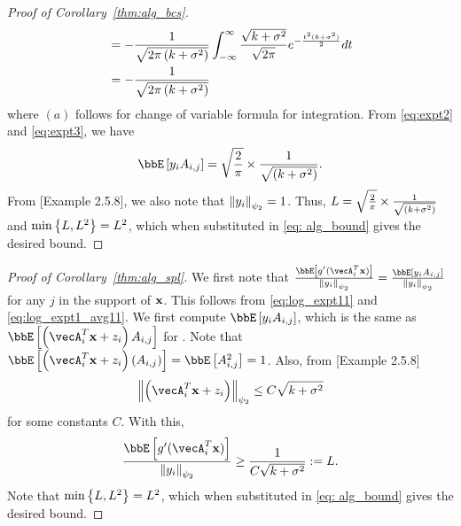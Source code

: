 \begin{proof}[Proof of Corollary~\ref{thm:alg_bcs}]
\begin{align}
& = -\frac{1}{\sqrt{2\pi\left(k+\sigma^2\right)}}\int_{-\infty}^{\infty}\frac{\sqrt{k+\sigma^2}}{\sqrt{2\pi}}e^{-\frac{t^2(k+\sigma^2)}{2}}dt\nonumber\\
& = -\frac{1}{\sqrt{2\pi\left(k+\sigma^2\right)}}\label{eq:expt3}
\end{align} where $(a)$ follows for change of variable formula for integration. From \eqref{eq:expt2} and \eqref{eq:expt3}, we have 
\begin{align}
\bbE\insq{y_i A_{i,j}} = \sqrt{\frac{2}{\pi}}\times\frac{1}{\sqrt{\inp{k+\sigma^2}}}.\label{eq:expt4}
\end{align} From [Example 2.5.8]\cite{vershynin}, we also note that $\left\lVert{y_i}\right\rVert_{\psi_2} = 1$. Thus, $L = \sqrt{\frac{2}{\pi}}\times\frac{1}{\sqrt{\left(k+\sigma^2\right)}}$ and $\min\left\{L, L^2\right\} = L^2$, which when substituted in \eqref{eq: alg_bound}  gives the desired bound.
\end{proof}

\begin{proof}[Proof of Corollary~\ref{thm:alg_spl}]
We first note that  $\frac{\bbE\insq{g'(\vecA_i^T\bx)}}{\normi{{y_i}}_{\psi_2}} = \frac{\bbE\insq{y_iA_{i,j}}}{\normi{{y_i}}_{\psi_2}}$ for  any $j$ in the support of $\mathbf{x}$. This follows from \eqref{eq:log_expt11} and \eqref{eq:log_expt1_avg11}. We first compute $\bbE\insq{y_iA_{i,j}}$, which is the same as $\bbE\insq{\inp{\vecA_i^T\bx+z_i}A_{i,j}}$ for \spl. 
Note that $\bbE\insq{\inp{\vecA_i^T\bx+z_i}\inp{A_{i, j}}} = \bbE\insq{A_{i, j}^2} = 1$.
Also, from [Example 2.5.8]\cite{vershynin} 
\begin{align*}
\normi{\inp{\vecA_i^T\bx+z_i}}_{\psi_2}\leq C\sqrt{k+\sigma^2}\\
\end{align*} for some constants $C$. With this,
\begin{align*}
\frac{\bbE\insq{g'(\vecA_i^T\bx)}}{\normi{{y_i}}_{\psi_2}}\geq \frac{1}{C\sqrt{k+\sigma^2}}: =L.
\end{align*}Note that $\min\left\{L, L^2\right\} = L^2$, which when substituted in \eqref{eq: alg_bound} gives the desired bound.
\end{proof}

